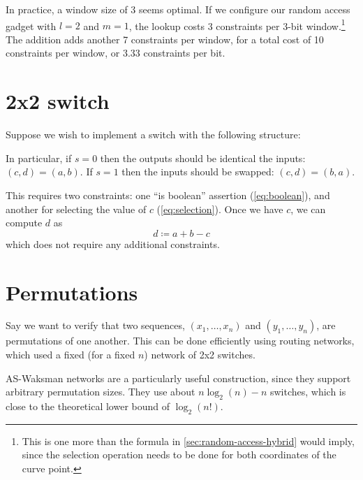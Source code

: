 \documentclass{article}
\begin{document}
In practice, a window size of 3 seems optimal. If we configure our random access gadget with $l = 2$ and $m = 1$, the lookup costs 3 constraints per 3-bit window.\footnote{This is one more than the formula in \autoref{sec:random-access-hybrid} would imply, since the selection operation needs to be done for both coordinates of the curve point.} The addition adds another 7 constraints per window, for a total cost of 10 constraints per window, or $3.33$ constraints per bit.


\section{2x2 switch}

Suppose we wish to implement a switch with the following structure:
\begin{center}
\end{center}
In particular, if $s = 0$ then the outputs should be identical the inputs: $(c, d) = (a, b)$. If $s = 1$ then the inputs should be swapped: $(c, d) = (b, a)$.

This requires two constraints: one ``is boolean'' assertion (\autoref{eq:boolean}), and another for selecting the value of $c$ (\autoref{eq:selection}). Once we have $c$, we can compute $d$ as
\begin{equation}
  d \coloneqq a + b - c
\end{equation}
which does not require any additional constraints.


\section{Permutations} \label{sec:permutations}

Say we want to verify that two sequences, $(x_1, \dots, x_n)$ and $(y_1, \dots, y_n)$, are permutations of one another. This can be done efficiently using routing networks, which used a fixed (for a fixed $n$) network of 2x2 switches.

AS-Waksman networks \cite{beauquier2002arbitrary} are a particularly useful construction, since they support arbitrary permutation sizes. They use about $n \log_2(n) - n$ switches, which is close to the theoretical lower bound of $\log_2(n!)$.
\end{document}
